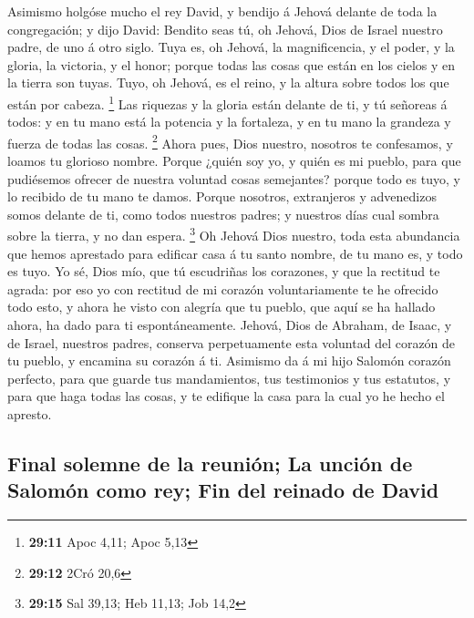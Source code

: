  Asimismo holgóse mucho el rey David, y bendijo á Jehová
delante de toda la congregación; y dijo David: Bendito seas tú, oh
Jehová, Dios de Israel nuestro padre, de uno á otro siglo.
 Tuya es, oh Jehová, la magnificencia, y el poder, y la
gloria, la victoria, y el honor; porque todas las cosas que están en los
cielos y en la tierra son tuyas. Tuyo, oh Jehová, es el reino, y la
altura sobre todos los que están por cabeza. \footnote{\textbf{29:11}
  Apoc 4,11; Apoc 5,13}  Las riquezas y la gloria están
delante de ti, y tú señoreas á todos: y en tu mano está la potencia y la
fortaleza, y en tu mano la grandeza y fuerza de todas las cosas.
\footnote{\textbf{29:12} 2Cró 20,6}  Ahora pues, Dios
nuestro, nosotros te confesamos, y loamos tu glorioso nombre.
 Porque ¿quién soy yo, y quién es mi pueblo, para que
pudiésemos ofrecer de nuestra voluntad cosas semejantes? porque todo es
tuyo, y lo recibido de tu mano te damos.  Porque
nosotros, extranjeros y advenedizos somos delante de ti, como todos
nuestros padres; y nuestros días cual sombra sobre la tierra, y no dan
espera. \footnote{\textbf{29:15} Sal 39,13; Heb 11,13; Job 14,2}
 Oh Jehová Dios nuestro, toda esta abundancia que hemos
aprestado para edificar casa á tu santo nombre, de tu mano es, y todo es
tuyo.  Yo sé, Dios mío, que tú escudriñas los corazones,
y que la rectitud te agrada: por eso yo con rectitud de mi corazón
voluntariamente te he ofrecido todo esto, y ahora he visto con alegría
que tu pueblo, que aquí se ha hallado ahora, ha dado para ti
espontáneamente.  Jehová, Dios de Abraham, de Isaac, y de
Israel, nuestros padres, conserva perpetuamente esta voluntad del
corazón de tu pueblo, y encamina su corazón á ti. 
Asimismo da á mi hijo Salomón corazón perfecto, para que guarde tus
mandamientos, tus testimonios y tus estatutos, y para que haga todas las
cosas, y te edifique la casa para la cual yo he hecho el apresto.

\hypertarget{final-solemne-de-la-reuniuxf3n-la-unciuxf3n-de-salomuxf3n-como-rey-fin-del-reinado-de-david}{%
\subsection{Final solemne de la reunión; La unción de Salomón como rey;
Fin del reinado de
David}\label{final-solemne-de-la-reuniuxf3n-la-unciuxf3n-de-salomuxf3n-como-rey-fin-del-reinado-de-david}}

